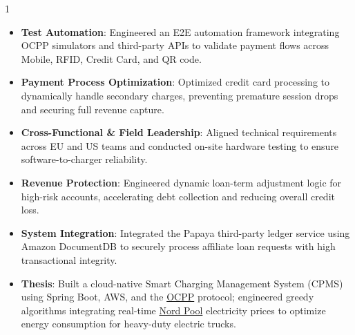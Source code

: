 \documentclass[9pt,a4paper,ragged2e,withhyper]{altacv}
\begin{document}
\begin{paracol}{1}
            \begin{itemize}
                \item \textbf{Test Automation}: Engineered an E2E automation framework integrating OCPP simulators and third-party APIs to validate payment flows across Mobile, RFID, Credit Card, and QR code.
                \item \textbf{Payment Process Optimization}: Optimized credit card processing to dynamically handle secondary charges, preventing premature session drops and securing full revenue capture.
                \item \textbf{Cross-Functional \& Field Leadership}: Aligned technical requirements across EU and US teams and conducted on-site hardware testing to ensure software-to-charger reliability.
            \end{itemize}
            \medskip

            \begin{itemize}
                \item \textbf{Revenue Protection}: Engineered dynamic loan-term adjustment logic for high-risk accounts, accelerating debt collection and reducing overall credit loss.
                \item \textbf{System Integration}: Integrated the Papaya third-party ledger service using Amazon DocumentDB to securely process affiliate loan requests with high transactional integrity.
            \end{itemize}
            \medskip

            \begin{itemize}
                \item \textbf{Thesis}: Built a cloud-native Smart Charging Management System (CPMS) using Spring Boot, AWS, and the \href{https://www.openchargealliance.org/}{OCPP} protocol; engineered greedy algorithms integrating real-time \href{https://www.nordpoolgroup.com/en/market-data12/Dayahead/Area-Prices/LT/Daily/?view=table}{Nord Pool} electricity prices to optimize energy consumption for heavy-duty electric trucks.
            \end{itemize}
            \medskip


\end{paracol}
\end{document}
